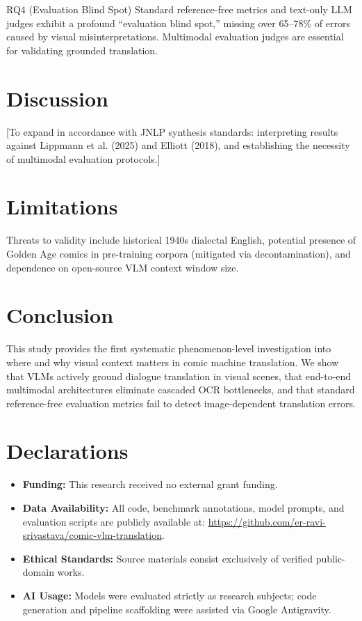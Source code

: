 \documentclass[11pt,a4paper]{article}
\begin{document}
\begin{keyfinding}{RQ4 (Evaluation Blind Spot)}
Standard reference-free metrics and text-only LLM judges exhibit a profound ``evaluation blind spot,'' missing over 65--78\% of errors caused by visual misinterpretations. Multimodal evaluation judges are essential for validating grounded translation.
\end{keyfinding}

\section{Discussion}
[To expand in accordance with JNLP synthesis standards: interpreting results against Lippmann et al. (2025) and Elliott (2018), and establishing the necessity of multimodal evaluation protocols.]

\section{Limitations}
Threats to validity include historical 1940s dialectal English, potential presence of Golden Age comics in pre-training corpora (mitigated via decontamination), and dependence on open-source VLM context window size.

\section{Conclusion}
This study provides the first systematic phenomenon-level investigation into where and why visual context matters in comic machine translation. We show that VLMs actively ground dialogue translation in visual scenes, that end-to-end multimodal architectures eliminate cascaded OCR bottlenecks, and that standard reference-free evaluation metrics fail to detect image-dependent translation errors.

\section*{Declarations}
\begin{itemize}[noitemsep]
    \item \textbf{Funding:} This research received no external grant funding.
    \item \textbf{Data Availability:} All code, benchmark annotations, model prompts, and evaluation scripts are publicly available at: \url{https://github.com/er-ravi-srivastava/comic-vlm-translation}.
    \item \textbf{Ethical Standards:} Source materials consist exclusively of verified public-domain works.
    \item \textbf{AI Usage:} Models were evaluated strictly as research subjects; code generation and pipeline scaffolding were assisted via Google Antigravity.
\end{itemize}
\end{document}
